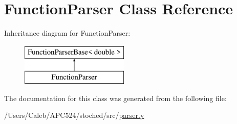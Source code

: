 \hypertarget{class_function_parser}{}\section{Function\+Parser Class Reference}
\label{class_function_parser}
Inheritance diagram for Function\+Parser\+:\begin{figure}[H]
\begin{center}
\leavevmode
\includegraphics[height=2.000000cm]{class_function_parser}
\end{center}
\end{figure}


The documentation for this class was generated from the following file\+:\begin{DoxyCompactItemize}
\item 
/\+Users/\+Caleb/\+A\+P\+C524/stoched/src/\hyperlink{parser_8y}{parser.\+y}\end{DoxyCompactItemize}
